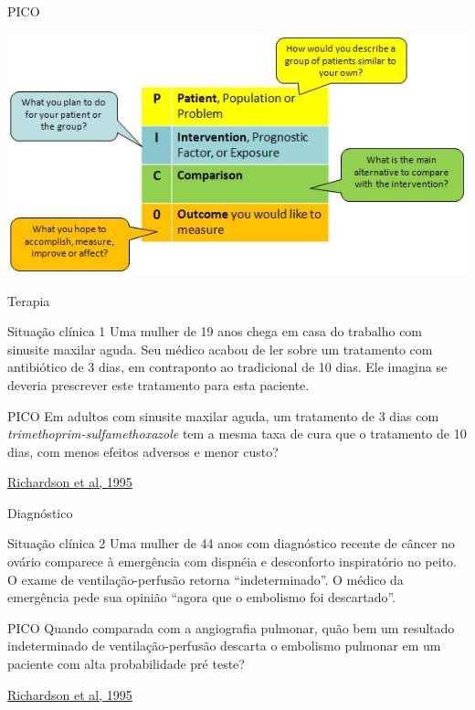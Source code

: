 \documentclass{beamer}
\begin{document}
\begin{frame}{PICO}
  \begin{center}
    \includegraphics[height=0.8\textheight]{Hipoteses_variaveis/pico}
  \end{center}
\end{frame}

\begin{frame}{Terapia}
  \begin{exampleblock}{Situação clínica 1}
    \scriptsize
    Uma mulher de 19 anos chega em casa do trabalho com sinusite maxilar aguda.
    Seu médico acabou de ler sobre um tratamento com antibiótico de 3 dias, em contraponto ao tradicional de 10 dias.
    Ele imagina se deveria prescrever este tratamento para esta paciente.
  \end{exampleblock}
  \begin{exampleblock}{PICO}
    Em adultos com sinusite maxilar aguda, um tratamento de 3 dias com {\em trimethoprim-sulfamethoxazole} tem a mesma taxa de cura que o tratamento de 10 dias, com menos efeitos adversos e menor custo?
  \end{exampleblock}
  \vfill
  \scriptsize
  \hfill \href{https://acpjc.acponline.org/Content/123/3/issue/ACPJC-1995-123-3-A12.htm}
      {Richardson et al, 1995}
\end{frame}

\begin{frame}{Diagnóstico}
  \begin{exampleblock}{Situação clínica 2}
    \scriptsize
    Uma mulher de 44 anos com diagnóstico recente de câncer no ovário comparece à emergência com dispnéia e desconforto inspiratório no peito.
    O exame de ventilação-perfusão retorna ``indeterminado''.
    O médico da emergência pede sua opinião ``agora que o embolismo foi descartado''.
  \end{exampleblock}
  \begin{exampleblock}{PICO}
    Quando comparada com a angiografia pulmonar, quão bem um resultado indeterminado de ventilação-perfusão descarta o embolismo pulmonar em um paciente com alta probabilidade pré teste?
  \end{exampleblock}
  \vfill
  \scriptsize
  \hfill \href{https://acpjc.acponline.org/Content/123/3/issue/ACPJC-1995-123-3-A12.htm}
  {Richardson et al, 1995}
\end{frame}
\end{document}
